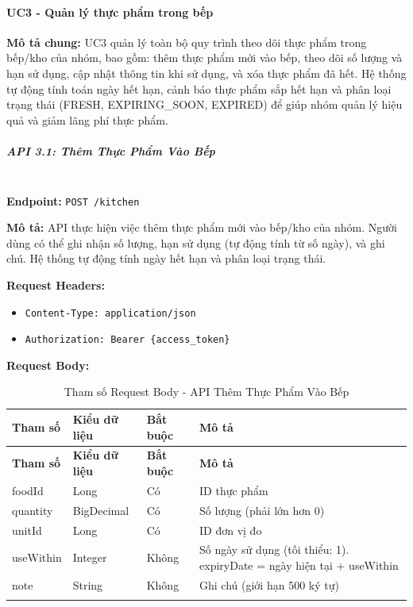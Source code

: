 \paragraph{UC3 - Quản lý thực phẩm trong bếp}

\textbf{Mô tả chung:} UC3 quản lý toàn bộ quy trình theo dõi thực phẩm trong bếp/kho của nhóm, bao gồm: thêm thực phẩm mới vào bếp, theo dõi số lượng và hạn sử dụng, cập nhật thông tin khi sử dụng, và xóa thực phẩm đã hết. Hệ thống tự động tính toán ngày hết hạn, cảnh báo thực phẩm sắp hết hạn và phân loại trạng thái (FRESH, EXPIRING\_SOON, EXPIRED) để giúp nhóm quản lý hiệu quả và giảm lãng phí thực phẩm.

\subparagraph{API 3.1: Thêm Thực Phẩm Vào Bếp}~\\

\textbf{Endpoint:} \texttt{POST /kitchen}

\textbf{Mô tả:} API thực hiện việc thêm thực phẩm mới vào bếp/kho của nhóm. Người dùng có thể ghi nhận số lượng, hạn sử dụng (tự động tính từ số ngày), và ghi chú. Hệ thống tự động tính ngày hết hạn và phân loại trạng thái.

\textbf{Request Headers:}
\begin{itemize}
    \item \texttt{Content-Type: application/json}
    \item \texttt{Authorization: Bearer \{access\_token\}}
\end{itemize}

\textbf{Request Body:}

\small
\begin{longtable}{|>{\raggedright\arraybackslash}p{3.5cm}|>{\raggedright\arraybackslash}p{2.5cm}|>{\raggedright\arraybackslash}p{2cm}|>{\raggedright\arraybackslash}p{5.5cm}|}
\hline
\textbf{Tham số} & \textbf{Kiểu dữ liệu} & \textbf{Bắt buộc} & \textbf{Mô tả} \\
\hline
\endfirsthead
\hline
\textbf{Tham số} & \textbf{Kiểu dữ liệu} & \textbf{Bắt buộc} & \textbf{Mô tả} \\
\hline
\endhead
foodId & Long & Có & ID thực phẩm \\
\hline
quantity & BigDecimal & Có & Số lượng (phải lớn hơn 0) \\
\hline
unitId & Long & Có & ID đơn vị đo \\
\hline
useWithin & Integer & Không & Số ngày sử dụng (tối thiểu: 1). expiryDate = ngày hiện tại + useWithin \\
\hline
note & String & Không & Ghi chú (giới hạn 500 ký tự) \\
\hline
\caption{Tham số Request Body - API Thêm Thực Phẩm Vào Bếp}
\end{longtable}

